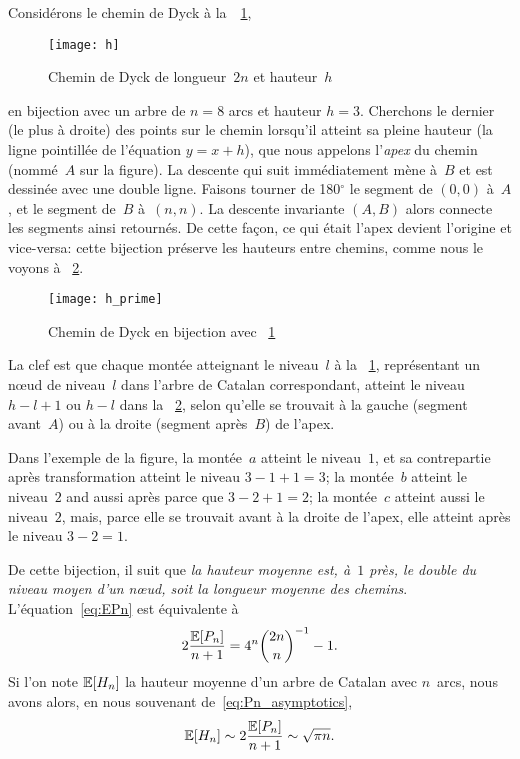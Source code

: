 Considérons le chemin de Dyck à la~\Fig~\ref{fig:h},
\begin{figure}
\centering
\texttt{[image: h]}
\caption{Chemin de Dyck de longueur~\(2n\) et hauteur~\(h\)}
\label{fig:h}
\end{figure}
en bijection avec un arbre de \(n=8\) arcs et hauteur
\(h=3\). Cherchons le dernier (le plus à droite) des points sur le
chemin lorsqu'il atteint sa pleine hauteur (la ligne pointillée de
l'équation \(y = x + h\)), que nous appelons l'\emph{apex} du chemin
(nommé~\(A\) sur la figure). La descente qui suit immédiatement mène
à~\(B\) et est dessinée avec une double ligne. Faisons tourner de
180$^\circ$ le segment de $(0,0)$ à~$A$, et le segment de~$B$
à~$(n,n)$. La descente invariante $(A,B)$ alors connecte les segments
ainsi retournés. De cette façon, ce qui était l'apex devient l'origine
et vice-versa: cette bijection préserve les hauteurs entre chemins,
comme nous le voyons à \fig~\ref{fig:h_prime}.
\begin{figure}
\centering
\texttt{[image: h\_prime]}
\caption{Chemin de Dyck en bijection avec \fig~\ref{fig:h}}
\label{fig:h_prime}
\end{figure}

La clef est que chaque montée atteignant le niveau~\(l\) à la
\fig~\ref{fig:h}, représentant un nœud de niveau~\(l\) dans l'arbre de
Catalan correspondant, atteint le niveau $h-l+1$ ou $h-l$ dans la
\fig~\ref{fig:h_prime}, selon qu'elle se trouvait à la gauche (segment
avant~$A$) ou à la droite (segment après~$B$) de l'apex.

Dans l'exemple de la figure, la montée~\(a\) atteint le niveau~\(1\),
et sa contrepartie après transformation atteint le niveau \(3-1+1=3\);
la montée~\(b\) atteint le niveau~\(2\) and aussi après parce que
\(3-2+1=2\); la montée~\(c\) atteint aussi le niveau~\(2\), mais,
parce elle se trouvait avant à la droite de l'apex, elle atteint après
le niveau \(3-2=1\).

De cette bijection, il suit que \emph{la hauteur moyenne est, à~\(1\)
près, le double du niveau moyen d'un nœud, soit la longueur moyenne
des chemins}. L'équation~\eqref{eq:EPn} est équivalente à
\begin{equation*}
2\frac{\mathbb{E}[{P_n}]}{n+1} = 4^{n}\binom{2n}{n}^{-1} - 1.
\end{equation*}
Si l'on note \(\mathbb{E}[{H_n}]\) la hauteur moyenne d'un arbre de
Catalan avec
\(n\)~arcs, nous avons alors, en nous souvenant de~\eqref{eq:Pn_asymptotics},
\begin{equation*}
\mathbb{E}[{H_n}] \sim 2\frac{\mathbb{E}[{P_n}]}{n+1} \sim \sqrt{\pi n}.
\end{equation*}
